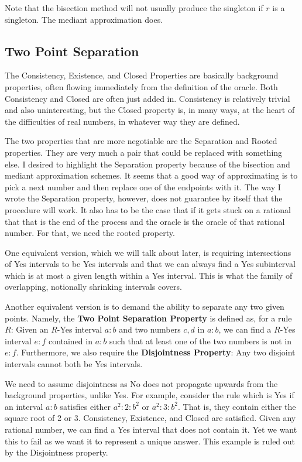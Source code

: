\documentclass[12pt]{article}
\theoremstyle{remark}
\begin{document}
Note that the bisection method will not usually produce the singleton if $r$ is a singleton. The mediant approximation does. 

\subsection{Two Point Separation}

The Consistency, Existence, and Closed Properties are basically background properties, often flowing immediately from the definition of the oracle. Both Consistency and Closed are often just added in. Consistency is relatively trivial and also uninteresting, but the Closed property is, in many ways, at the heart of the difficulties of real numbers, in whatever way they are defined. 

The two properties that are more negotiable are the Separation and Rooted properties. They are very much a pair that could be replaced with something else. I desired to highlight the Separation property because of the bisection and mediant approximation schemes. It seems that a good way of approximating is to pick a next number and then replace one of the endpoints with it. The way I wrote the Separation property, however, does not guarantee by itself that the procedure will work. It also has to be the case that if it gets stuck on a rational that that is the end of the process and the oracle is the oracle of that rational number. For that, we need the rooted property. 

One equivalent version, which we will talk about later, is requiring intersections of Yes intervals to be Yes intervals and that we can always find a Yes subinterval which is at most a given length within a Yes interval. This is what the family of overlapping, notionally shrinking intervals covers. 

Another equivalent version is to demand the ability to separate any two given points. Namely, the \textbf{Two Point Separation Property} is defined as, for a rule $R$: Given an $R$-Yes interval $a:b$ and two numbers $c,d$ in $a:b$, we can find a $R$-Yes interval $e:f$ contained in $a:b$ such that at least one of the two numbers is not in $e:f$. Furthermore, we also require the \textbf{Disjointness Property}: Any two disjoint intervals cannot both be Yes intervals. 

We need to assume disjointness as No does not propagate upwards from the background properties, unlike Yes. For example, consider the rule which is Yes if an interval $a:b$ satisfies either $a^2:2:b^2$ or $a^2:3:b^2$. That is, they contain either the square root of 2 or 3. Consistency, Existence, and Closed are satisfied. Given any rational number, we can find a Yes interval that does not contain it. Yet we want this to fail as we want it to represent a unique answer. This example is ruled out by the Disjointness property. 
\end{document}
